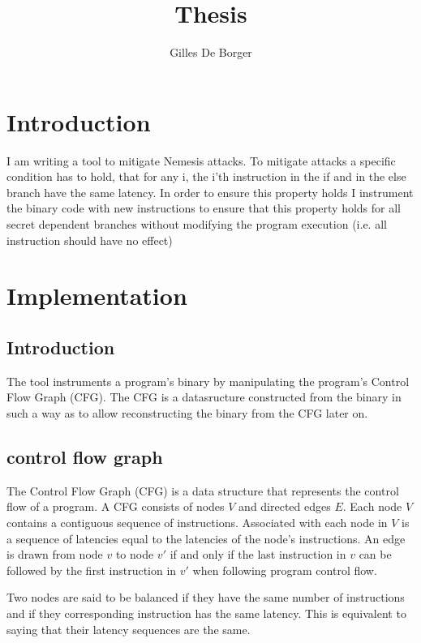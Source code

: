 \documentclass{article}
\author{Gilles De Borger}
\title{Thesis}
\begin{document}
\maketitle
 



\section{Introduction}
I am writing a tool to mitigate Nemesis attacks. To mitigate attacks a specific condition has to hold, that for any i, the i'th instruction in the if 
and in the else branch have the same latency.  In order to ensure this property holds I instrument the binary code with new instructions to ensure that
this property holds for all secret dependent branches without modifying the program execution (i.e. all instruction should have no effect)



\section{Implementation}

\subsection{Introduction}
The tool instruments a program's binary by manipulating the program's Control Flow Graph (CFG). The CFG is a datasructure constructed from the binary in such a way 
as to allow reconstructing the binary from the CFG later on. 

\subsection{control flow graph}
The Control Flow Graph (CFG) is a data structure that represents the control flow of a program. A CFG consists of nodes $V$ and directed edges $E$. Each node $V$ contains a contiguous sequence of instructions. Associated with each node 
in $V$ is a sequence of latencies equal to the latencies of the node's instructions. An edge is drawn from node $v$ to node $v'$ if and only if the last instruction in $v$ can be followed by the first instruction in $v'$ when following 
program control flow. 

Two nodes are said to be balanced if they have the same number of instructions and if they corresponding instruction has the same latency. This is equivalent to saying that their latency sequences are the same. 
\end{document}
